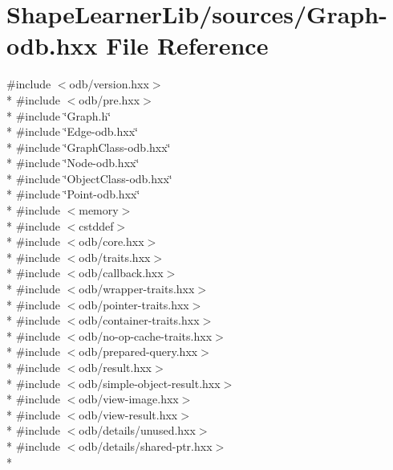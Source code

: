 \hypertarget{_graph-odb_8hxx}{}\section{Shape\+Learner\+Lib/sources/\+Graph-\/odb.hxx File Reference}
\label{_graph-odb_8hxx}
{\ttfamily \#include $<$odb/version.\+hxx$>$}\\*
{\ttfamily \#include $<$odb/pre.\+hxx$>$}\\*
{\ttfamily \#include \char`\"{}Graph.\+h\char`\"{}}\\*
{\ttfamily \#include \char`\"{}Edge-\/odb.\+hxx\char`\"{}}\\*
{\ttfamily \#include \char`\"{}Graph\+Class-\/odb.\+hxx\char`\"{}}\\*
{\ttfamily \#include \char`\"{}Node-\/odb.\+hxx\char`\"{}}\\*
{\ttfamily \#include \char`\"{}Object\+Class-\/odb.\+hxx\char`\"{}}\\*
{\ttfamily \#include \char`\"{}Point-\/odb.\+hxx\char`\"{}}\\*
{\ttfamily \#include $<$memory$>$}\\*
{\ttfamily \#include $<$cstddef$>$}\\*
{\ttfamily \#include $<$odb/core.\+hxx$>$}\\*
{\ttfamily \#include $<$odb/traits.\+hxx$>$}\\*
{\ttfamily \#include $<$odb/callback.\+hxx$>$}\\*
{\ttfamily \#include $<$odb/wrapper-\/traits.\+hxx$>$}\\*
{\ttfamily \#include $<$odb/pointer-\/traits.\+hxx$>$}\\*
{\ttfamily \#include $<$odb/container-\/traits.\+hxx$>$}\\*
{\ttfamily \#include $<$odb/no-\/op-\/cache-\/traits.\+hxx$>$}\\*
{\ttfamily \#include $<$odb/prepared-\/query.\+hxx$>$}\\*
{\ttfamily \#include $<$odb/result.\+hxx$>$}\\*
{\ttfamily \#include $<$odb/simple-\/object-\/result.\+hxx$>$}\\*
{\ttfamily \#include $<$odb/view-\/image.\+hxx$>$}\\*
{\ttfamily \#include $<$odb/view-\/result.\+hxx$>$}\\*
{\ttfamily \#include $<$odb/details/unused.\+hxx$>$}\\*
{\ttfamily \#include $<$odb/details/shared-\/ptr.\+hxx$>$}\\*
